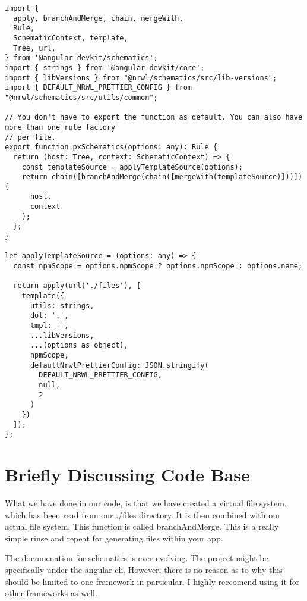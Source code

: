 \begin{lstlisting}
import {
  apply, branchAndMerge, chain, mergeWith,
  Rule,
  SchematicContext, template,
  Tree, url,
} from '@angular-devkit/schematics';
import { strings } from '@angular-devkit/core';
import { libVersions } from "@nrwl/schematics/src/lib-versions";
import { DEFAULT_NRWL_PRETTIER_CONFIG } from "@nrwl/schematics/src/utils/common";

// You don't have to export the function as default. You can also have more than one rule factory
// per file.
export function pxSchematics(options: any): Rule {
  return (host: Tree, context: SchematicContext) => {
    const templateSource = applyTemplateSource(options);
    return chain([branchAndMerge(chain([mergeWith(templateSource)]))])(
      host,
      context
    );
  };
}

let applyTemplateSource = (options: any) => {
  const npmScope = options.npmScope ? options.npmScope : options.name;

  return apply(url('./files'), [
    template({
      utils: strings,
      dot: '.',
      tmpl: '',
      ...libVersions,
      ...(options as object),
      npmScope,
      defaultNrwlPrettierConfig: JSON.stringify(
        DEFAULT_NRWL_PRETTIER_CONFIG,
        null,
        2
      )
    })
  ]);
};
\end{lstlisting}

\section{ Briefly Discussing Code Base}
What we have done in our code, is that we have created a virtual file system,
which has been read from our ./files directory. It is then combined with our
actual file system. This function is called branchAndMerge. This is a really
simple rinse and repeat for generating files within your app.

The documenation for schematics is ever evolving. The project might be
specifically under the angular-cli. However, there is no reason as to why this
should be limited to one framework in particular. I highly reccomend using it
for other frameworks as well.

